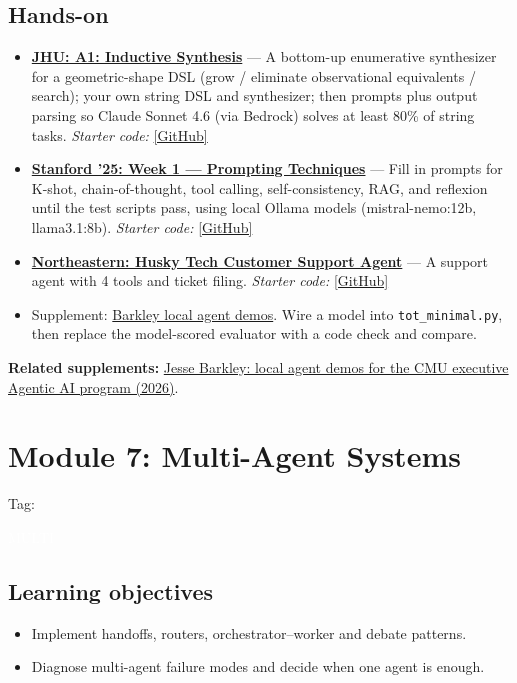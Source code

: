 \documentclass[10pt,oneside]{report}
\newcommand{\tg}[1]{{\setlength{\fboxsep}{1.2pt}\colorbox{tag#1}{\kern1pt\textcolor{white}{\sffamily\bfseries\fontsize{5.5}{6}\selectfont\strut #1}\kern1.5pt}}}
\begin{document}
\section{Hands-on}
\begin{itemize}
\item \hyperlink{asg-JHU-1}{\textbf{JHU: A1: Inductive Synthesis}} --- A bottom-up enumerative synthesizer for a geometric-shape DSL (grow / eliminate observational equivalents / search); your own string DSL and synthesizer; then prompts plus output parsing so Claude Sonnet 4.6 (via Bedrock) solves at least 80\% of string tasks. \textit{Starter code:} \href{https://github.com/machine-programming/assignment-1}{[GitHub]}
\item \hyperlink{asg-STAN25-1}{\textbf{Stanford '25: Week 1 --- Prompting Techniques}} --- Fill in prompts for K-shot, chain-of-thought, tool calling, self-consistency, RAG, and reflexion until the test scripts pass, using local Ollama models (mistral-nemo:12b, llama3.1:8b). \textit{Starter code:} \href{https://github.com/mihail911/modern-software-dev-assignments/tree/fall2025/week1}{[GitHub]}
\item \hyperlink{asg-NEU-4}{\textbf{Northeastern: Husky Tech Customer Support Agent}} --- A support agent with 4 tools and ticket filing. \textit{Starter code:} \href{https://github.com/agenticllms/lecture-files/tree/main/W03b}{[GitHub]}
\item Supplement: \hyperref[sup-barkley]{Barkley local agent demos}. Wire a model into \texttt{tot\_minimal.py}, then replace the model-scored evaluator with a code check and compare.
\end{itemize}
\textbf{Related supplements:} \hyperref[sup-barkley]{Jesse Barkley: local agent demos for the CMU executive Agentic AI program (2026)}.
\chapter{Module 7: Multi-Agent Systems}\hypertarget{mod-MULTI}{}
{\small Tag: \tg{MULTI}}
\section{Learning objectives}
\begin{itemize}
\item Implement handoffs, routers, orchestrator--worker and debate patterns.
\item Diagnose multi-agent failure modes and decide when one agent is enough.
\end{itemize}
\end{document}
